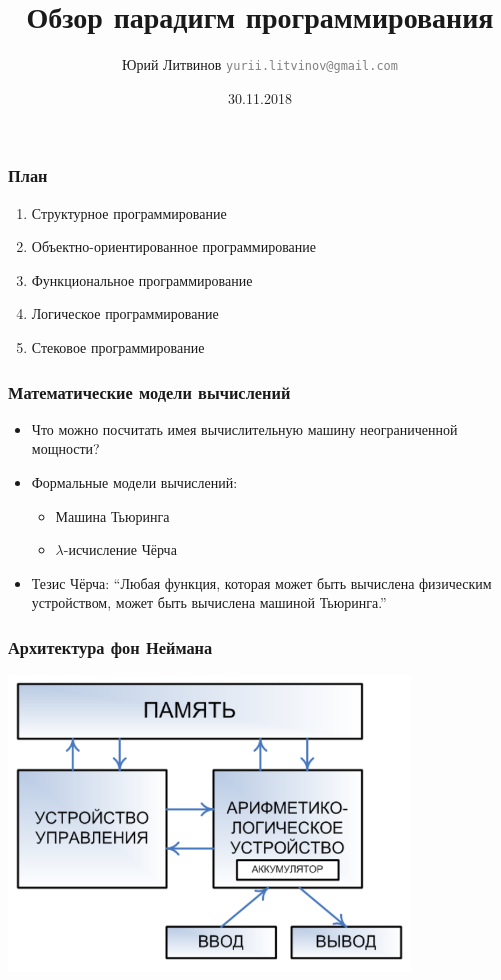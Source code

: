 \documentclass[xetex,mathserif,serif]{beamer}
\title{Обзор парадигм программирования}
\author[Юрий Литвинов]{Юрий Литвинов \newline \textcolor{gray}{\small\texttt{yurii.litvinov@gmail.com}}}
\date{30.11.2018}
\begin{document}
	
	\frame{\titlepage}

	\begin{frame}
		\frametitle{План}
		\begin{enumerate}
			\item Структурное программирование
			\item Объектно-ориентированное программирование
			\item Функциональное программирование
			\item Логическое программирование
			\item Стековое программирование
		\end{enumerate}
	\end{frame}

	\begin{frame}
		\frametitle{Математические модели вычислений}
		\begin{itemize}
			\item Что можно посчитать имея вычислительную машину неограниченной мощности?
			\item Формальные модели вычислений:
			\begin{itemize}
				\item Машина Тьюринга
				\item $\lambda$-исчисление Чёрча
			\end{itemize}
			\item Тезис Чёрча: ``Любая функция, которая может быть вычислена физическим устройством, может быть вычислена машиной Тьюринга.''
		\end{itemize}
	\end{frame}

	\begin{frame}
		\frametitle{Архитектура фон Неймана}
		\begin{center}
			\includegraphics[width=0.8\textwidth]{von-neumann-architecture.png}
		\end{center}
	\end{frame}
\end{document}
